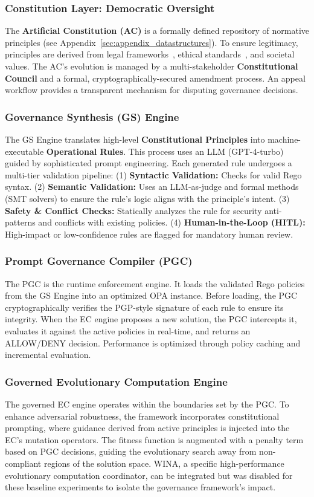 \subsubsection{Constitution Layer: Democratic Oversight}
The \textbf{Artificial Constitution (AC)} is a formally defined repository of normative principles (see Appendix~\ref{sec:appendix_datastructures}). To ensure legitimacy, principles are derived from legal frameworks~\cite{gdpr2016}, ethical standards~\cite{barocas2019fairness}, and societal values. The AC's evolution is managed by a multi-stakeholder \textbf{Constitutional Council} and a formal, cryptographically-secured amendment process. An appeal workflow provides a transparent mechanism for disputing governance decisions.

\subsubsection{Governance Synthesis (GS) Engine}
The GS Engine translates high-level \textbf{Constitutional Principles} into machine-executable \textbf{Operational Rules}. This process uses an LLM (GPT-4-turbo) guided by sophisticated prompt engineering. Each generated rule undergoes a multi-tier validation pipeline:
(1) \textbf{Syntactic Validation:} Checks for valid Rego syntax.
(2) \textbf{Semantic Validation:} Uses an LLM-as-judge and formal methods (SMT solvers) to ensure the rule's logic aligns with the principle's intent.
(3) \textbf{Safety \& Conflict Checks:} Statically analyzes the rule for security anti-patterns and conflicts with existing policies.
(4) \textbf{Human-in-the-Loop (HITL):} High-impact or low-confidence rules are flagged for mandatory human review.

\subsubsection{Prompt Governance Compiler (PGC)}
The PGC is the runtime enforcement engine. It loads the validated Rego policies from the GS Engine into an optimized OPA instance. Before loading, the PGC cryptographically verifies the PGP-style signature of each rule to ensure its integrity. When the EC engine proposes a new solution, the PGC intercepts it, evaluates it against the active policies in real-time, and returns an ALLOW/DENY decision. Performance is optimized through policy caching and incremental evaluation.

\subsubsection{Governed Evolutionary Computation Engine}
The governed EC engine operates within the boundaries set by the PGC. To enhance adversarial robustness, the framework incorporates constitutional prompting, where guidance derived from active principles is injected into the EC's mutation operators. The fitness function is augmented with a penalty term based on PGC decisions, guiding the evolutionary search away from non-compliant regions of the solution space. WINA, a specific high-performance evolutionary computation coordinator, can be integrated but was disabled for these baseline experiments to isolate the governance framework's impact.
